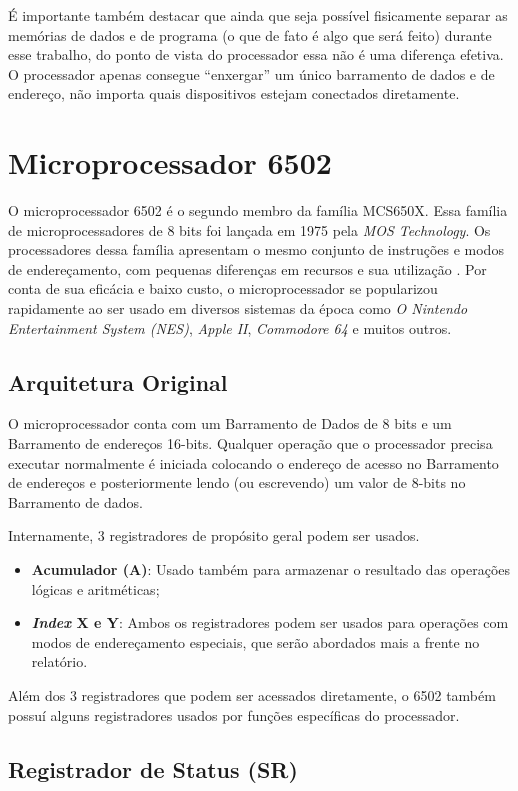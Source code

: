 \documentclass[
	12pt,				  %
	openright,		%
	a4paper,			%
	english,			%
	french,				%
	spanish,			%
	brazil,				%
]{abntex2}
\begin{document}
É importante também destacar que ainda que seja possível fisicamente separar
as memórias de dados e de programa (o que de fato é algo que será feito) durante
esse trabalho, do ponto de vista do processador essa não é uma diferença efetiva.
O processador apenas consegue ``enxergar'' um único barramento de dados e de
endereço, não importa quais dispositivos estejam conectados diretamente.

\section{Microprocessador 6502} \label{sec:6502}
O microprocessador 6502 é o segundo membro da família MCS650X. Essa família de
microprocessadores de 8 bits foi lançada em 1975 pela \emph{MOS Technology}.
Os processadores dessa família apresentam o mesmo conjunto de instruções e modos
de endereçamento, com pequenas diferenças em recursos e sua utilização
\cite{mosHardware1976}. Por conta de sua eficácia e baixo custo, o
microprocessador se popularizou rapidamente ao ser usado em diversos sistemas
da época como \emph{O Nintendo Entertainment System (NES)}, \emph{Apple II},
\emph{Commodore 64} e muitos outros.
\subsection{Arquitetura Original}
O microprocessador conta com um Barramento de Dados de 8 bits e um Barramento de
endereços 16-bits. Qualquer operação que o processador precisa executar
normalmente é iniciada colocando o endereço de acesso no Barramento de endereços
e posteriormente lendo (ou escrevendo) um valor de 8-bits no Barramento de dados.

Internamente, 3 registradores de propósito geral podem ser usados.
\begin{itemize}
	\item \textbf{Acumulador (A)}: Usado também para armazenar o resultado das
	      operações lógicas e aritméticas;
	\item \textbf{\emph{Index} X e Y}: Ambos os registradores podem ser usados
	      para operações com modos de endereçamento especiais, que serão abordados
	      mais a frente no relatório.
\end{itemize}

Além dos 3 registradores que podem ser acessados diretamente, o 6502 também
possuí alguns registradores usados por funções específicas do processador.

\subsection{Registrador de Status (SR)} \label{statusReg}
\end{document}
